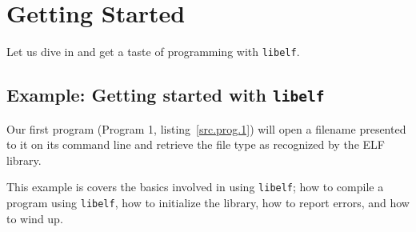 \documentclass[a4paper,pdftex]{book}
\newcommand{\library}[1]{\texttt{#1}}
\begin{document}
\chapter{Getting Started}\label{chap.getting-started}

Let us dive in and get a taste of programming with \library{libelf}.

\section{Example: Getting started with \library{libelf}}

Our first program (Program 1, listing~\vref{src.prog.1}) will open a
filename presented to it on its command line and retrieve the file
type as recognized by the ELF library.

This example is covers the basics involved in using \library{libelf};
how to compile a program using \library{libelf}, how to initialize the
library, how to report errors, and how to wind up.
\end{document}
